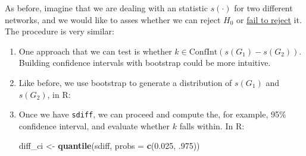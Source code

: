 \documentclass[
]{book}
\newenvironment{Shaded}{\begin{snugshade}}{\end{snugshade}}
\newcommand{\AttributeTok}[1]{\textcolor[rgb]{0.13,0.29,0.53}{#1}}
\newcommand{\CommentTok}[1]{\textcolor[rgb]{0.56,0.35,0.01}{\textit{#1}}}
\newcommand{\ControlFlowTok}[1]{\textcolor[rgb]{0.13,0.29,0.53}{\textbf{#1}}}
\newcommand{\DecValTok}[1]{\textcolor[rgb]{0.00,0.00,0.81}{#1}}
\newcommand{\FloatTok}[1]{\textcolor[rgb]{0.00,0.00,0.81}{#1}}
\newcommand{\FunctionTok}[1]{\textcolor[rgb]{0.13,0.29,0.53}{\textbf{#1}}}
\newcommand{\NormalTok}[1]{#1}
\newcommand{\OtherTok}[1]{\textcolor[rgb]{0.56,0.35,0.01}{#1}}
\newcommand{\SpecialCharTok}[1]{\textcolor[rgb]{0.81,0.36,0.00}{\textbf{#1}}}
\begin{document}
As before, imagine that we are dealing with an statistic \(s(\cdot)\) for two
different networks, and we would like to asses whether we can reject \(H_0\)
or \href{https://www.thoughtco.com/fail-to-reject-in-a-hypothesis-test-3126424}{fail to reject} it.
The procedure is very similar:

\begin{enumerate}
\def\labelenumi{\arabic{enumi}.}
\item
  One approach that we can test is whether \(k \in \mbox{ConfInt}(s(G_1) - s(G_2))\).
  Building confidence intervals with bootstrap could be more intuitive.
\item
  Like before, we use bootstrap to generate a distribution of \(s(G_1)\) and
  \(s(G_2)\), in R:

\begin{Shaded}
\end{Shaded}
\item
  Once we have \texttt{sdiff}, we can proceed and compute the, for example, 95\%
  confidence interval, and evaluate whether \(k\) falls within. In R:

\begin{Shaded}
\begin{Highlighting}[]
\NormalTok{diff\_ci }\OtherTok{\textless{}{-}} \FunctionTok{quantile}\NormalTok{(sdiff, }\AttributeTok{probs =} \FunctionTok{c}\NormalTok{(}\FloatTok{0.025}\NormalTok{, .}\DecValTok{975}\NormalTok{))}
\end{Highlighting}
\end{Shaded}
\end{enumerate}
\end{document}
